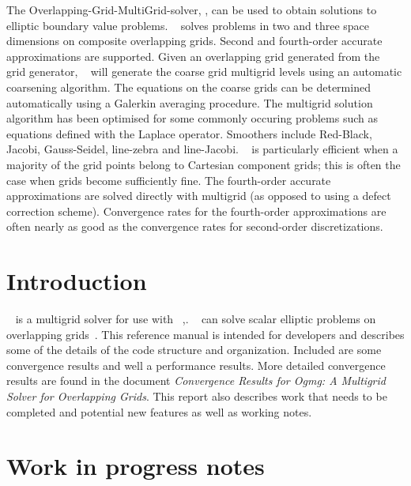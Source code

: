 \documentclass{article}
\begin{document}
\begin{flushleft}
The Overlapping-Grid-MultiGrid-solver, \Ogmg, can be used to obtain solutions 
to elliptic boundary value problems.
\Ogmg~ solves problems in two and three space
dimensions on composite overlapping grids. 
Second and fourth-order accurate approximations are supported.
Given an overlapping grid generated from the \Ogen~  grid generator,
\Ogmg~  will generate the coarse grid multigrid levels using an automatic coarsening algorithm.
The equations on the coarse grids can be determined automatically using a Galerkin averaging
procedure.
The multigrid solution algorithm has been optimised for some commonly occuring problems such as
equations defined with the Laplace operator.
Smoothers include Red-Black, Jacobi, Gauss-Seidel, line-zebra and line-Jacobi.
\Ogmg~  is particularly efficient when a majority of the grid points belong to Cartesian component grids;
this is often the case when grids become sufficiently fine.
The fourth-order accurate approximations are solved directly with multigrid (as opposed to using
a defect correction scheme). Convergence rates for the fourth-order approximations are often nearly as
good as the convergence rates for second-order discretizations.
\end{flushleft}

\clearpage
\tableofcontents



\clearpage
\section{Introduction}

\Ogmg~ is a multigrid solver for use with \Overture~\cite{overset96},\cite{OGES}.
\Ogmg~ can solve scalar elliptic problems
on overlapping grids~\cite{automg,CGMG}. This reference manual is intended for developers and describes
some of the details of the code structure and organization.
Included are some convergence results and well a performance results. More detailed
convergence results are found in the document {\em  Convergence Results for Ogmg: A Multigrid Solver for Overlapping Grids}.
This report also describes work that needs to be completed and potential new features
as well as working notes.



\section{Work in progress notes}
\end{document}
